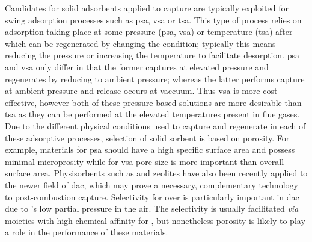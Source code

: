 Candidates for solid \glspl{adsorbent} applied to  capture are typically exploited for swing adsorption processes such as \acrfull{psa}, \acrfull{vsa} or \acrfull{tsa}. This type of process relies on \gls{adsorption} taking place at some pressure (\acrshort{psa}, \acrshort{vsa}) or temperature (\acrshort{tsa}) after which  can be regenerated by changing the condition; typically this means reducing the pressure or increasing the temperature to facilitate desorption.\citep{bahamon2018energetic, hedin2013adsorbents, Zhao2018Synthesis, adewole2013current, ho2008reducing}  \acrshort{psa} and \acrshort{vsa} only differ in that the former captures  at elevated pressure and regenerates by reducing to ambient pressure; whereas the latter performs capture at ambient pressure and release occurs at vaccuum. Thus \acrshort{vsa} is more cost effective, however both of these pressure-based solutions are more desirable than \acrshort{tsa} as they can be performed at the elevated temperatures present in flue gases.\citep{ho2008reducing, adewole2013current, Pirngruber2013} Due to the different physical conditions used to capture and regenerate  in each of these adsorptive processes, selection of solid sorbent is based on porosity. For example, materials for \acrshort{psa} should have a high specific surface area and possess minimal microprosity while for \acrshort{vsa} pore size is more important than overall surface area.\citep{ho2008reducing, Chou2004, Presser2011Effect} Physisorbents such as  and zeolites have also been recently applied to the newer field of \acrfull{dac}, which may prove a necessary, complementary technology to post-combustion capture.\citep{kumar2015direct, mcqueen2021review, deutz2021life} Selectivity for  over  is particularly important in \acrshort{dac} due to 's low partial pressure in the air. The selectivity is usually facilitated \textit{via} moieties with high chemical affinity for , but nonetheless porosity is likely to play a role in the performance of these materials.\citep{kumar2015direct, darunte2016direct, deng2021comparative}

